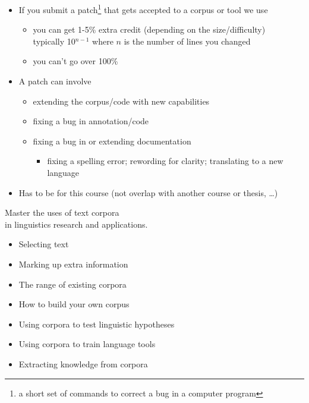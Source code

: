 \documentclass[a4paper,landscape,headrule,footrule,xetex]{foils}
\begin{document}

\begin{itemize}
\item If you submit a patch\footnote{a short set of commands to correct a bug in a computer program} that gets accepted to a corpus or tool we use
  \begin{itemize}
  \item you can get 1-5\% extra credit (depending on the size/difficulty)
    \\ typically 10$^{n-1}$ where $n$ is the number of lines you changed
  \item you can't go over 100\%
  \end{itemize}
\item A patch can involve
  \begin{itemize}
  \item extending the corpus/code with new capabilities
  \item fixing a bug in annotation/code
  \item fixing a bug in or extending documentation
    \begin{itemize}
    \item fixing a spelling error; rewording for clarity; translating to a new language
    \end{itemize}
  \end{itemize}
\item Has to be for this course (not overlap with another course or thesis, \ldots)
\end{itemize}



\begin{center}
  \LARGE 
Master the uses of text corpora 
\\ in linguistics research and applications.
\end{center}
\begin{itemize}\addtolength{\itemsep}{-1ex}
\item Selecting text
\item Marking up extra information
\item The range of existing corpora
\item How to build your own corpus
\item Using corpora to test linguistic hypotheses
\item Using corpora to train language tools
\item Extracting knowledge from corpora
\end{itemize}
\end{document}
